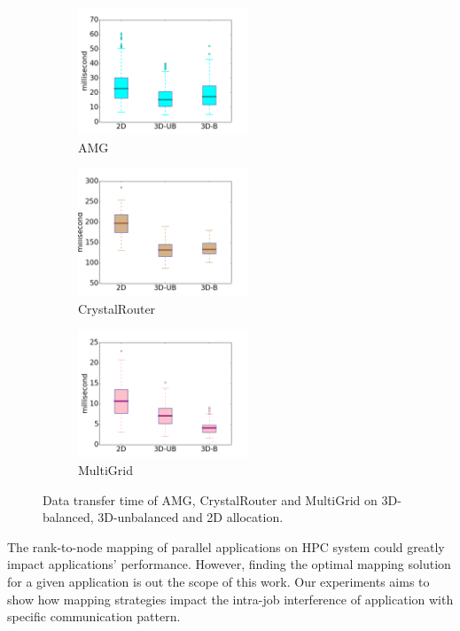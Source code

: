 \begin{figure}[t!]
    \centering
    \begin{subfigure}[t]{0.32\textwidth}
        \centering
        \includegraphics[height=1.5in]{figs/intra-job/shapestudy/amg_box}
        \caption{AMG}
        \label{fig:shapstudy-amg}
    \end{subfigure}%
    \hspace{1em}%
    \begin{subfigure}[t]{0.32\textwidth}
        \centering
        \includegraphics[height=1.5in]{figs/intra-job/shapestudy/cr_box}
        \caption{CrystalRouter}
        \label{fig:shapstudy-cr}
    \end{subfigure}%
    \begin{subfigure}[t]{0.32\textwidth}
        \centering
        \includegraphics[height=1.5in]{figs/intra-job/shapestudy/mg_box}
        \caption{MultiGrid}
        \label{fig:shapstudy-mg}
    \end{subfigure}%
   \caption{Data transfer time of AMG, CrystalRouter and MultiGrid on 3D-balanced, 3D-unbalanced and 2D allocation.}
   \label{fig:shapestudy}
\end{figure}


The rank-to-node mapping of parallel applications on HPC system could greatly impact applications' performance. However, finding the optimal mapping solution for a given application is out the scope of this work. Our experiments aims to show how mapping strategies impact the intra-job interference of application with specific communication pattern.

